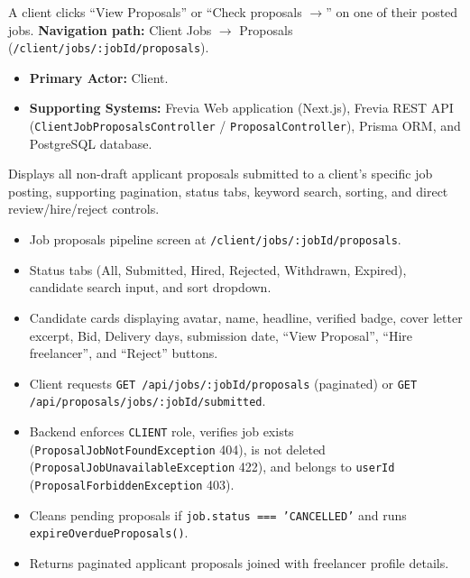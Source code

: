 A client clicks ``View Proposals'' or ``Check proposals $\rightarrow$'' on one of their posted jobs.\newline
\textbf{Navigation path:} Client Jobs $\rightarrow$ Proposals (\texttt{/client/jobs/:jobId/proposals}).


\begin{itemize}[leftmargin=1.6em,topsep=3pt,itemsep=2pt,parsep=0pt,label=$\bullet$]
    \item \textbf{Primary Actor:} Client.
    \item \textbf{Supporting Systems:} Frevia Web application (Next.js), Frevia REST API (\texttt{ClientJobProposalsController} / \texttt{ProposalController}), Prisma ORM, and PostgreSQL database.
\end{itemize}

\noindent Displays all non-draft applicant proposals submitted to a client's specific job posting, supporting pagination, status tabs, keyword search, sorting, and direct review/hire/reject controls.

\begin{itemize}[leftmargin=1.6em,topsep=3pt,itemsep=2pt,parsep=0pt,label=$\bullet$]
    \item Job proposals pipeline screen at \texttt{/client/jobs/:jobId/proposals}.
    \item Status tabs (All, Submitted, Hired, Rejected, Withdrawn, Expired), candidate search input, and sort dropdown.
    \item Candidate cards displaying avatar, name, headline, verified badge, cover letter excerpt, Bid, Delivery days, submission date, ``View Proposal'', ``Hire freelancer'', and ``Reject'' buttons.
\end{itemize}

\begin{itemize}[leftmargin=1.6em,topsep=3pt,itemsep=2pt,parsep=0pt,label=$\bullet$]
    \item Client requests \texttt{GET /api/jobs/:jobId/proposals} (paginated) or \texttt{GET /api/proposals/jobs/:jobId/submitted}.
    \item Backend enforces \texttt{CLIENT} role, verifies job exists (\texttt{Proposal\allowbreak{}Job\allowbreak{}Not\allowbreak{}Found\allowbreak{}Exception} 404), is not deleted (\texttt{Proposal\allowbreak{}Job\allowbreak{}Unavailable\allowbreak{}Exception} 422), and belongs to \texttt{userId} (\texttt{Proposal\allowbreak{}Forbidden\allowbreak{}Exception} 403).
    \item Cleans pending proposals if \texttt{job.\allowbreak{}status =\allowbreak{}=\allowbreak{}= 'CANCELLED'} and runs \texttt{expire\allowbreak{}Overdue\allowbreak{}Proposals()}.
    \item Returns paginated applicant proposals joined with freelancer profile details.
\end{itemize}

